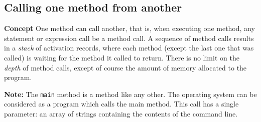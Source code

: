 \subsection{Calling one method from another}\label{method.03}

\textbf{Concept} One method can call another, that is, when executing
one method, any statement or expression call be a method call. A sequence
of method calls results in a \emph{stack} of activation records,
where each method (except the last one that was called) 
is waiting for the method it called to return. 
There is no limit on the \emph{depth} of method calls,
except of course the amount of memory allocated to the program.

\textbf{Note:} The \texttt{main} method is a method like any other. 
The operating system can be considered as a program which calls the main method.
This call has a single parameter: an array of strings containing the contents
of the command line.


